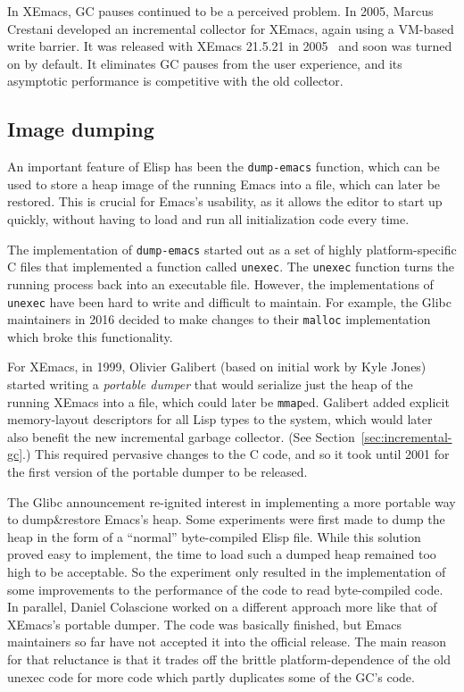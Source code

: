 \documentclass[format=acmsmall, review=false, screen=true]{acmart}
\newcommand \Elisp {Elisp}
\begin{document}
\label{sec:incremental-gc}
In XEmacs, GC pauses continued to be a perceived problem.  In 2005, Marcus
Crestani developed an incremental collector for XEmacs, again using
a VM-based write barrier.  It was released with XEmacs 21.5.21 in
2005~\cite{Crestani2005} and soon was turned on by default.  It
eliminates GC pauses from the user experience, and its asymptotic
performance is competitive with the old collector.

\subsection{Image dumping}
\label{sec:image-dumping}

An important feature of \Elisp{} has been the \texttt{dump-emacs}
function, which can be used to store a heap image of the running Emacs
into a file, which can later be restored.  This is crucial for Emacs's
usability, as it allows the editor to start up quickly, without
having to load and run all initialization code every time.

The implementation of \texttt{dump-emacs} started out as a set of
highly platform-specific C files that implemented a function called
\texttt{unexec}.  The \texttt{unexec} function turns the running
process back into an executable file.  However, the implementations of
\texttt{unexec} have been hard to write and difficult to maintain.
For example, the Glibc maintainers in 2016 decided to make changes to their
\texttt{malloc} implementation which broke this functionality.

For XEmacs, in 1999, Olivier Galibert (based on initial work by Kyle
Jones) started writing a \emph{portable dumper} that would serialize
just the heap of the running XEmacs into a file, which could later be
\texttt{mmap}ed.  Galibert added explicit memory-layout descriptors
for all Lisp types to the system, which would later also benefit the
new incremental garbage collector.  (See
Section~\ref{sec:incremental-gc}.)  This required pervasive changes to
the C code, and so it took until 2001 for the first version of the
portable dumper to be released.

The Glibc announcement re-ignited interest in implementing a more portable
way to dump\&restore Emacs's heap.  Some experiments were first made to dump
the heap in the form of a ``normal'' byte-compiled \Elisp{} file.
While this solution proved easy to implement, the time to load such a dumped
heap remained too high to be acceptable.  So the experiment only resulted in
the implementation of some improvements to the performance of the code to
read byte-compiled code.  In parallel, Daniel Colascione worked on
a different approach more like that of XEmacs's portable dumper.  The code
was basically finished, but Emacs maintainers so far have not accepted it
into the official release.  The main reason for that reluctance is that it
trades off the brittle platform-dependence of the old unexec code for more
code which partly duplicates some of the GC's code.
\end{document}
